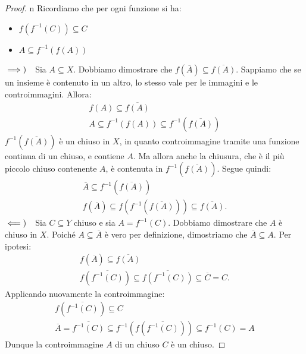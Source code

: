 \begin{proof}{n}
Ricordiamo che per ogni funzione si ha:
\begin{itemize}
\item $f\left(f^{-1}\left(C\right)\right)\subseteq C$
\item $A\subseteq f^{-1}\left(f\left(A\right)\right)$
\end{itemize} 
$\implies)\quad$Sia $A\subseteq X$. Dobbiamo dimostrare che $f\left(\overline{A}\right)\subseteq\overline{f\left(A\right)}$. Sappiamo che se un insieme è contenuto in un altro, lo stesso vale per le immagini e le controimmagini. Allora:
\begin{gather*}
f\left(A\right)\subseteq \overline{f\left(A\right)}\\
A\subseteq f^{-1}\left(f\left(A\right)\right)\subseteq f^{-1}\left(\overline{f\left(A\right)}\right)
\end{gather*}
$f^{-1}\left(\overline{f\left(A\right)}\right)$ è un chiuso in $X$, in quanto controimmagine tramite una funzione continua di un chiuso, e contiene $A$.
Ma allora anche la chiusura, che è il più piccolo chiuso contenente $A$, è contenuta in $f^{-1}\left(\overline{f\left(A\right)}\right)$. Segue quindi:
\begin{gather*}
	\overline{A}\subseteq f^{-1}\left(\overline{f\left(A\right)}\right)\\
	f\left(\overline{A}\right)\subseteq f\left(f^{-1}\left(\overline{f\left(A\right)}\right)\right)\subseteq\overline{f\left(A\right)}.
\end{gather*}
$\impliedby)\quad$Sia $C\subseteq Y$ chiuso e sia $A=f^{-1}\left(C\right)$. Dobbiamo dimostrare che $A$ è chiuso in $X$.
Poiché $A\subseteq \overline{A}$ è vero per definizione, dimostriamo che $\overline{A}\subseteq A$. Per ipotesi:
\begin{gather*}
f\left(\overline{A}\right)\subseteq\overline{f\left(A\right)}\\
f\left(\overline{f^{-1}\left(C\right)}\right)\subseteq\overline{f\left(f^{-1}\left(C\right)\right)}\subseteq \overline{C}=C.
\end{gather*}
Applicando nuovamente la controimmagine:
\begin{gather*}
f\left(\overline{f^{-1}\left(C\right)}\right)\subseteq C\\
\overline{A}=\overline{f^{-1}\left(C\right)}\subseteq f^{-1}\left(f\left(\overline{f^{-1}\left(C\right)}\right)\right)\subseteq f^{-1}\left(C\right)=A
\end{gather*}
Dunque la controimmagine $A$ di un chiuso $C$ è un chiuso.
\end{proof}

